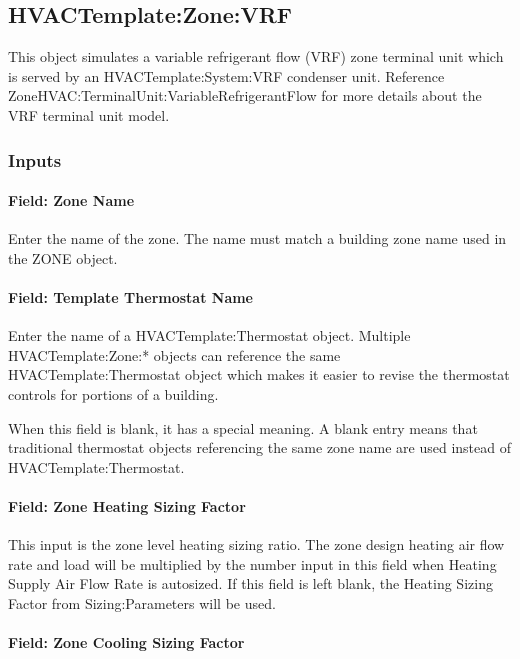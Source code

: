 \subsection{HVACTemplate:Zone:VRF}\label{hvactemplatezonevrf}

This object simulates a variable refrigerant flow (VRF) zone terminal unit which is served by an HVACTemplate:System:VRF condenser unit. Reference ZoneHVAC:TerminalUnit:VariableRefrigerantFlow for more details about the VRF terminal unit model.

\subsubsection{Inputs}\label{inputs-7-011}

\paragraph{Field: Zone Name}\label{field-zone-name-6-001}

Enter the name of the zone. The name must match a building zone name used in the ZONE object.

\paragraph{Field: Template Thermostat Name}\label{field-template-thermostat-name-6}

Enter the name of a HVACTemplate:Thermostat object. Multiple HVACTemplate:Zone:* objects can reference the same HVACTemplate:Thermostat object which makes it easier to revise the thermostat controls for portions of a building.

When this field is blank, it has a special meaning. A blank entry means that traditional thermostat objects referencing the same zone name are used instead of HVACTemplate:Thermostat.

\paragraph{Field: Zone Heating Sizing Factor}\label{field-zone-heating-sizing-factor-5}

This input is the zone level heating sizing ratio. The zone design heating air flow rate and load will be multiplied by the number input in this field when Heating Supply Air Flow Rate is autosized. If this field is left blank, the Heating Sizing Factor from Sizing:Parameters will be used.

\paragraph{Field: Zone Cooling Sizing Factor}\label{field-zone-cooling-sizing-factor-4}

